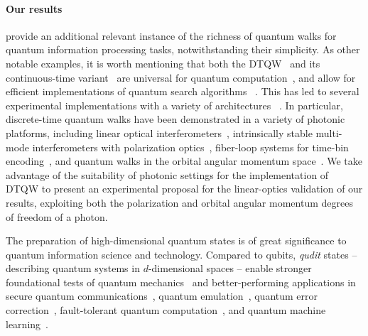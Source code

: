\paragraph{Our results}
provide an additional relevant instance of the richness of quantum walks for quantum information processing tasks, notwithstanding their simplicity.
As other notable examples, it is worth mentioning that both the DTQW~\cite{aharonov1993quantum} and its continuous-time variant~\cite{farhi1998quantum} are universal for quantum computation~\cite{childs2009universal,childs2013universal},
and allow for efficient implementations of quantum search algorithms~%
\cite{shenvi2003quantum,ambainis2005coins,tulsi2008faster}.
This has led to several experimental implementations with a variety of architectures~%
\cite{cote2006quantum, schwartz2007transport, chandrashekar2008quantum, perets2008realization, karski2009quantum, schmitz2009quantum, zhringer2010realization, peruzzo2010quantum, owens2011twophoton, weitenberg2011singlespin, giuseppe2013einsteinpodolskyrosen, fukuhara2013microscopic, poulios2014quantum, preiss2015strongly, chapman2016experimental, caruso2016fast}.
In particular, discrete-time quantum walks have been demonstrated in a variety of photonic platforms,
including linear optical interferometers~\cite{sansoni2012twoparticle,crespi2013anderson,harris2015bosonic,pitsios2016photonic},
intrinsically stable multi-mode interferometers with polarization optics~\cite{broome2010discrete,kitagawa2012observation,vitelli2013joining},
fiber-loop systems for time-bin encoding~\cite{schreiber2010photons,schreiber2012a,boutari2016large},
and quantum walks in the orbital angular momentum space~\cite{cardano2015quantum,cardano2016statistical}.
We take advantage of the suitability of photonic settings for the implementation of DTQW to present an experimental proposal for the linear-optics validation of our results, exploiting both the polarization and orbital angular momentum degrees of freedom of a photon.

The preparation of high-dimensional quantum states is of great significance to quantum information science and technology. 
Compared to qubits, \textit{qudit} states -- describing quantum systems in $d$-dimensional spaces --
enable stronger foundational tests of quantum mechanics~\cite{vértesi2010closing,brunner2014bell, lapkiewicz2011experimental} and better-performing applications in secure quantum communications~\cite{bechmannpasquinucci2000quantum, fitzi2001quantum, cerf2002security, bru2002optimal, acin2003security, langford2004measuring}, quantum emulation~\cite{buluta2009quantum,neeley2009emulation}, quantum error correction~\cite{chuang1997bosonic,duclos-cianci2013kitaev,michael2016class}, fault-tolerant quantum computation~\cite{bartlett2002quantum, ralph2007efficient,lanyon2008simplifying,campbell2012magicstate,campbell2014enhanced}, and quantum machine learning~\cite{schuld2014introduction,dunjko2017machine,biamonte2017quantum}. 

